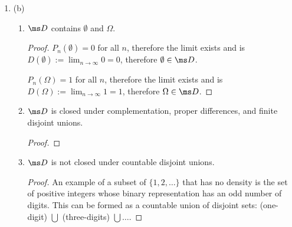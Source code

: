 \begin{enumerate}
\begin{enumerate}[label=(\alph*)]
\begin{proof}
      To show that $\ms D$ is not countably additive, it is sufficient to provide a counter-example.

      Let $A_i = \{i\}$ for all $i \in \{1, 2, \ldots\}$ and let $\ms A = \bigcup_{i=1}^\infty A_i$ be the collection of all the singleton sets.

      Note that $D(A_i) = 0$ for all $i$. However $\bigcup_{i=1}^\infty A_i = \N$ and
      therefore $D\big(\bigcup_{i=1}^\infty A_i\big) = 1$. Therefore $D$ is not countably additive, since
      \begin{align*}
        \sum_{i=1}^\infty D(A_i) = \sum_{i=1}^\infty 0 = 0 \neq 1 = D\big(\bigcup_{i=1}^\infty A_i\big).
      \end{align*}
    \end{proof}

  \item (b)
    \begin{enumerate}
    \item
      \begin{claim*}
         $\ms D$ contains $\emptyset$ and $\Omega$.
      \end{claim*}
      \begin{proof}
        $P_n(\emptyset) = 0$ for all $n$, therefore the limit exists and
        is $D(\emptyset) := \lim_{n\to\infty} 0 = 0$, therefore $\emptyset \in \ms D$.

        $P_n(\Omega) = 1$ for all $n$, therefore the limit exists and
        is $D(\Omega) := \lim_{n\to\infty} 1 = 1$, therefore $\Omega \in \ms D$.
      \end{proof}
    \item
      \begin{claim*}
         $\ms D$ is closed under complementation, proper differences, and finite disjoint unions.
      \end{claim*}
      \begin{proof}
      \end{proof}
    \item
      \begin{claim*}
         $\ms D$ is not closed under countable disjoint unions.
      \end{claim*}
      \begin{proof}
        An example of a subset of $\{1, 2, \ldots\}$ that has no density is the set of positive integers whose
        binary representation has an odd number of digits. This can be formed as a countable union of disjoint
        sets: (one-digit) $\bigcup$ (three-digits) $\bigcup \ldots$.


\end{proof}
\end{enumerate}
\end{enumerate}
\end{enumerate}
